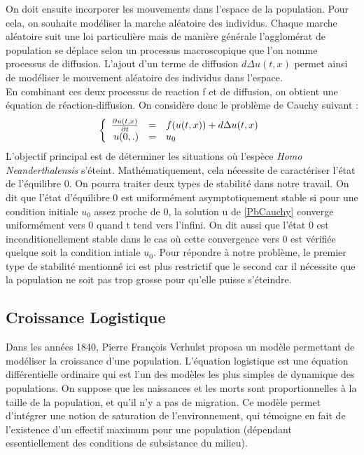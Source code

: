 \documentclass[a4paper,11pt]{article}
\begin{document}
On doit ensuite incorporer les mouvements dans l'espace de la population. Pour cela, on souhaite modéliser la marche aléatoire des individus. Chaque marche aléatoire suit une loi particulière mais de manière générale l'agglomérat de population se déplace selon un processus macroscopique que l'on nomme processus de diffusion.
L'ajout d'un terme de diffusion $d\Delta u(t,x)$ permet ainsi de modéliser le mouvement aléatoire des individus dans l'espace.\\
\newline
 En combinant ces deux processus de reaction f et  de  diffusion, on obtient une équation de réaction-diffusion.
On considère donc le problème de Cauchy suivant : 
\begin{equation}\label{PbCauchy}
\left\{
\begin{array}{r c l}
 \frac{\partial u(t,x)}{\partial t}&=&f(u(t,x))+d\Delta u(t,x)\\
u(0,.) &=& u_0\\
\end{array}
\right.
\end{equation}
L'objectif principal est de déterminer les situations où l'espèce \textit{Homo Neanderthalensis} s'éteint. Mathématiquement, cela nécessite de caractériser l'état de l'équilibre 0. On pourra traiter deux types de stabilité dans notre travail.
On dit que l'état d'équilibre 0 est uniformément asymptotiquement stable si pour une condition initiale $u_0$ assez proche de 0, la solution u de \ref{PbCauchy} converge uniformément vers 0 quand t tend vers l'infini. On dit aussi que l'état 0 est inconditionellement stable dans le cas où cette convergence vers 0 est vérifiée quelque soit la condition intiale $u_0$. Pour répondre à notre problème, le premier type de stabilité mentionné ici est plus restrictif que le second car il nécessite que la population ne soit pas trop grosse pour qu'elle puisse s'éteindre.   



\subsection{Croissance Logistique}
Dans les années 1840, Pierre François Verhulst proposa un modèle permettant de modéliser la croissance d'une population. L'équation logistique est une équation différentielle ordinaire qui est l'un des modèles les plus simples de dynamique des populations. On suppose que les naissances et les morts sont proportionnelles à la taille de la population, et qu'il n'y a pas de migration. Ce modèle permet d'intégrer une notion de saturation de l'environnement, qui témoigne en fait de l'existence d'un effectif maximum pour une population (dépendant essentiellement des conditions de subsistance du milieu). 
\end{document}
